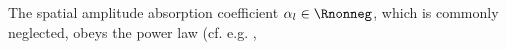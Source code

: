 The spatial amplitude absorption coefficient
$\alpha_{l} \in \Rnonneg$, which is
commonly neglected, obeys
the power law
(cf. e.g.
\cite[Sect. 4.3.8]{book:Duck1990},
\cite[(4)]{article:WellsUMB1975}%
